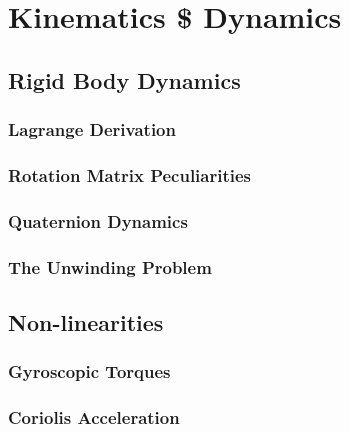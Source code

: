 \chapter{Kinematics \$ Dynamics}
\label{ch:dynamics}
\section{Rigid Body Dynamics}
\label{sec:dynamics.rigidbody}
\subsection{Lagrange Derivation}
\label{subsec:dynamics.rigidbody.lagrange}
\subsection{Rotation Matrix Peculiarities}\label{subsec:dynamics.rigidbody.singularity}
\subsection{Quaternion Dynamics}
\label{subsec:dynamics.rigidbody.quaternion}
\subsection{The Unwinding Problem}
\label{subsec:dynamics.rigidbody.unwinding}

\section{Non-linearities}
\label{sec:dynamics.nonlinearities}
\subsection{Gyroscopic Torques}
\label{subsec:dynamics.nonlinearities.gyrotorques}
\subsection{Coriolis Acceleration}
\label{subsec:dynamics.nonlinearities.coriolis}

